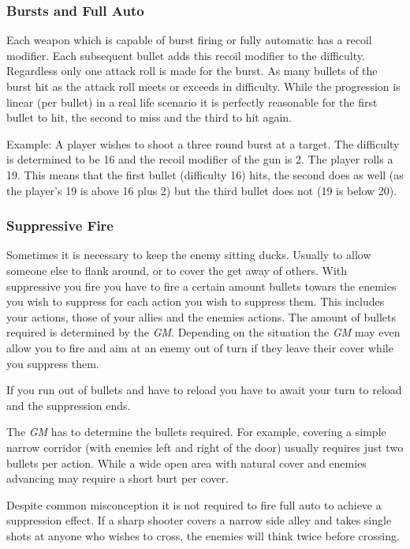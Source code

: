 \subsubsection{Bursts and Full Auto}

Each weapon which is capable of burst firing or fully automatic has a recoil
modifier. Each subsequent bullet adds this recoil modifier to the difficulty.
Regardless only one attack roll is made for the burst. As many bullets of the
burst hit as the attack roll meets or exceeds in difficulty. While the
progression is linear (per bullet) in a real life scenario it is perfectly
reasonable for the first bullet to hit, the second to miss and the third to
hit again.

Example: A player wishes to shoot a three round burst at a target. The
difficulty is determined to be 16 and the recoil modifier of the gun is 2.
The player rolls a 19. This means that the first bullet (difficulty 16) hits,
the second does as well (as the player's 19 is above 16 plus 2) but the third
bullet does not (19 is below 20).

\subsubsection{Suppressive Fire}

Sometimes it is necessary to keep the enemy sitting ducks. Usually to allow
someone else to flank around, or to cover the get away of others. With
suppressive you fire you have to fire a certain amount bullets towars the
enemies you wish to suppress for each action you wish to suppress them. This
includes your actions, those of your allies and the enemies actions. The
amount of bullets required is determined by the \emph{GM}. Depending on the
situation the \emph{GM} may even allow you to fire and aim at an enemy out of
turn if they leave their cover while you suppress them.

If you run out of bullets and have to reload you have to await your turn to
reload and the suppression ends.

The \emph{GM} has to determine the bullets required. For example, covering a
simple narrow corridor (with enemies left and right of the door) usually
requires just two bullets per action. While a wide open area with natural
cover and enemies advancing may require a short burt per cover.

Despite common misconception it is not required to fire full auto to achieve
a suppression effect. If a sharp shooter covers a narrow side alley and takes
single shots at anyone who wishes to cross, the enemies will think twice before
crossing.

